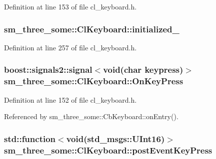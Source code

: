 Definition at line 153 of file cl\+\_\+keyboard.\+h.

\subsubsection[{\texorpdfstring{initialized\+\_\+}{initialized_}}]{ sm\+\_\+three\+\_\+some\+::\+Cl\+Keyboard\+::initialized\+\_\+\hspace{0.3cm}{\ttfamily [private]}}\hypertarget{classsm__three__some_1_1ClKeyboard_aec79ba7c7e1005a0e27e44cebf48e93e}{}\label{classsm__three__some_1_1ClKeyboard_aec79ba7c7e1005a0e27e44cebf48e93e}


Definition at line 257 of file cl\+\_\+keyboard.\+h.

\subsubsection[{\texorpdfstring{On\+Key\+Press}{OnKeyPress}}]{\setlength{\rightskip}{0pt plus 5cm}boost\+::signals2\+::signal$<$void(char keypress)$>$ sm\+\_\+three\+\_\+some\+::\+Cl\+Keyboard\+::\+On\+Key\+Press}\hypertarget{classsm__three__some_1_1ClKeyboard_a7784f67d867d66f36a2389b7939dffa2}{}\label{classsm__three__some_1_1ClKeyboard_a7784f67d867d66f36a2389b7939dffa2}


Definition at line 152 of file cl\+\_\+keyboard.\+h.



Referenced by sm\+\_\+three\+\_\+some\+::\+Cb\+Keyboard\+::on\+Entry().

\subsubsection[{\texorpdfstring{post\+Event\+Key\+Press}{postEventKeyPress}}]{\setlength{\rightskip}{0pt plus 5cm}std\+::function$<$void(std\+\_\+msgs\+::\+U\+Int16)$>$ sm\+\_\+three\+\_\+some\+::\+Cl\+Keyboard\+::post\+Event\+Key\+Press}\hypertarget{classsm__three__some_1_1ClKeyboard_a046d6fdc78a670d84714d6adecb12010}{}\label{classsm__three__some_1_1ClKeyboard_a046d6fdc78a670d84714d6adecb12010}


